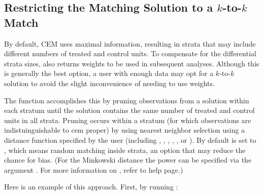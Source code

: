 \documentclass[article]{jss}
\begin{document}
\subsection{Restricting the Matching Solution to a $k$-to-$k$ Match}

By default, CEM uses maximal information, resulting in strata that may
include different numbers of treated and control units.  To compensate
for the differential strata sizes,  also returns weights to
be used in subsequent analyses.  Although this is generally the best
option, a user with enough data may opt for a $k$-to-$k$ solution to
avoid the slight inconvenience of needing to use weights.

The function  accomplishes this by pruning observations from
a  solution within each stratum until the solution contains
the same number of treated and control units in all strata.  Pruning
occurs within a stratum (for which observations are indistuinguishable
to cem proper) by using nearest neighbor selection using a distance
function specified by the user (including ,
, , , , or
). By default  is set to ,
which means random matching inside  strata, an option that
may reduce the chance for bias.  (For the Minkowski distance the power
can be specified via the argument .  For more information
on , refer to  help page.)  

Here is an example of this approach.  First, by running :
\end{document}
